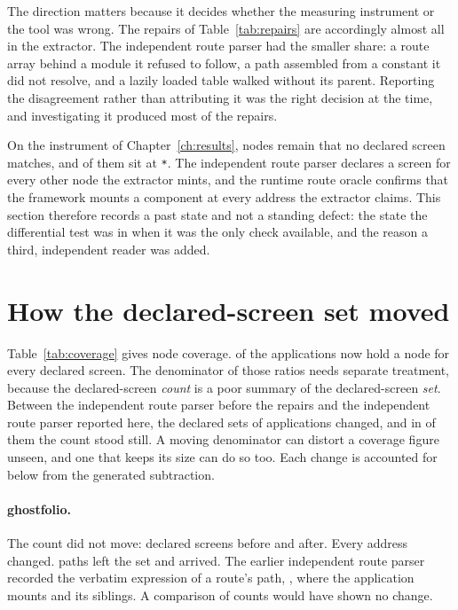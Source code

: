 The direction matters because it decides whether the measuring instrument or the tool was wrong. The repairs of Table~\ref{tab:repairs} are accordingly almost all in the extractor. The independent route parser had the smaller share: a route array behind a module it refused to follow, a path assembled from a constant it did not resolve, and a lazily loaded table walked without its parent. Reporting the disagreement rather than attributing it was the right decision at the time, and investigating it produced most of the repairs.

On the instrument of Chapter~\ref{ch:results}, \RoundTwoExtraNodes{} nodes remain that no declared screen matches, and \RoundTwoExtraNodesWildcard{} of them sit at \texttt{*}. The independent route parser declares a screen for every other node the extractor mints, and the runtime route oracle confirms that the framework mounts a component at every address the extractor claims. This section therefore records a past state and not a standing defect: the state the differential test was in when it was the only check available, and the reason a third, independent reader was added.

\section{How the declared-screen set moved}
\label{app:setmoved}

Table~\ref{tab:coverage} gives node coverage. \RoundTwoFullNodes{} of the \CensusApps{} applications now hold a node for every declared screen. The denominator of those ratios needs separate treatment, because the declared-screen \emph{count} is a poor summary of the declared-screen \emph{set}. Between the independent route parser before the repairs and the independent route parser reported here, the declared sets of \RoundTwoSetMoved{} applications changed, and in \RoundTwoSetMovedCountSame{} of them the count stood still. A moving denominator can distort a coverage figure unseen, and one that keeps its size can do so too. Each change is accounted for below from the generated subtraction.

\paragraph{ghostfolio.} The count did not move: \RoundTwoEarlierOracleGhostfolioDeclared{} declared screens before and \RoundTwoEarlierOracleGhostfolioNow{} after. Every address changed. \RoundTwoEarlierOracleGhostfolioInside{} paths left the set and \RoundTwoEarlierOracleGhostfolioAdded{} arrived. The earlier independent route parser recorded the verbatim expression of a route's path, , where the application mounts  and its siblings. A comparison of counts would have shown no change.

